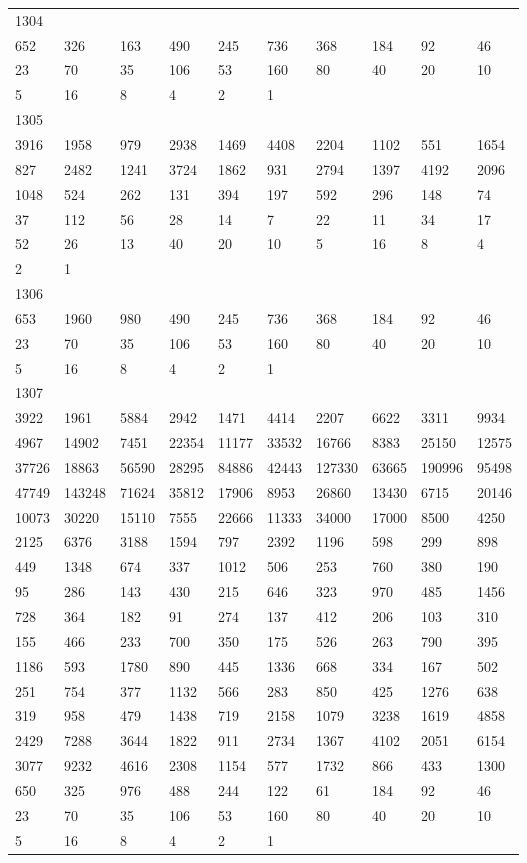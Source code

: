 \begin{longtable}{*{10}{l}}
1304&&&&&&&&&\\
652& 326& 163& 490& 245& 736& 368& 184& 92& 46\\
23& 70& 35& 106& 53& 160& 80& 40& 20& 10\\
5& 16& 8& 4& 2& 1& \\

1305&&&&&&&&&\\
3916& 1958& 979& 2938& 1469& 4408& 2204& 1102& 551& 1654\\
827& 2482& 1241& 3724& 1862& 931& 2794& 1397& 4192& 2096\\
1048& 524& 262& 131& 394& 197& 592& 296& 148& 74\\
37& 112& 56& 28& 14& 7& 22& 11& 34& 17\\
52& 26& 13& 40& 20& 10& 5& 16& 8& 4\\
2& 1& \\

1306&&&&&&&&&\\
653& 1960& 980& 490& 245& 736& 368& 184& 92& 46\\
23& 70& 35& 106& 53& 160& 80& 40& 20& 10\\
5& 16& 8& 4& 2& 1& \\

1307&&&&&&&&&\\
3922& 1961& 5884& 2942& 1471& 4414& 2207& 6622& 3311& 9934\\
4967& 14902& 7451& 22354& 11177& 33532& 16766& 8383& 25150& 12575\\
37726& 18863& 56590& 28295& 84886& 42443& 127330& 63665& 190996& 95498\\
47749& 143248& 71624& 35812& 17906& 8953& 26860& 13430& 6715& 20146\\
10073& 30220& 15110& 7555& 22666& 11333& 34000& 17000& 8500& 4250\\
2125& 6376& 3188& 1594& 797& 2392& 1196& 598& 299& 898\\
449& 1348& 674& 337& 1012& 506& 253& 760& 380& 190\\
95& 286& 143& 430& 215& 646& 323& 970& 485& 1456\\
728& 364& 182& 91& 274& 137& 412& 206& 103& 310\\
155& 466& 233& 700& 350& 175& 526& 263& 790& 395\\
1186& 593& 1780& 890& 445& 1336& 668& 334& 167& 502\\
251& 754& 377& 1132& 566& 283& 850& 425& 1276& 638\\
319& 958& 479& 1438& 719& 2158& 1079& 3238& 1619& 4858\\
2429& 7288& 3644& 1822& 911& 2734& 1367& 4102& 2051& 6154\\
3077& 9232& 4616& 2308& 1154& 577& 1732& 866& 433& 1300\\
650& 325& 976& 488& 244& 122& 61& 184& 92& 46\\
23& 70& 35& 106& 53& 160& 80& 40& 20& 10\\
5& 16& 8& 4& 2& 1& \\


\end{longtable}
